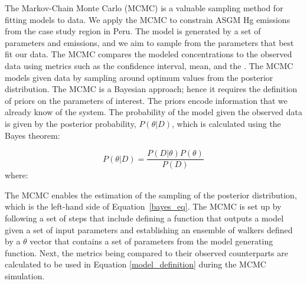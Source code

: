 \begin{flushleft}
The Markov-Chain Monte Carlo (MCMC) is a valuable sampling method for fitting models to data\cite{hogg_data_2018}. We apply the MCMC to constrain ASGM Hg emissions from the case study region in Peru.  The model is generated by a set of parameters and emissions, and we aim to sample from the parameters that best fit our data. The MCMC compares the modeled concentrations to the observed data using metrics such as the \nft confidence interval, mean, and the \iq. The MCMC models given data by sampling around optimum values from the posterior distribution. The MCMC is a Bayesian approach; hence it requires the definition of priors on the parameters of interest. The priors encode information that we already know of the system. The probability of the model given the observed data is given by the posterior probability, $P(\theta|D)$, which is calculated using the Bayes theorem:

\begin{equation}
\label{bayes_eq}
P(\theta|D)=\frac{P(D|\theta)P(\theta)}{P(D)}
\end{equation}
where:
\end{flushleft}


\begin{flushleft}
The MCMC enables the estimation of the sampling of the posterior distribution, which is the left-hand side of Equation~\ref{bayes_eq}. The MCMC is set up by following a set of steps that include defining a function that outputs a model given a set of input parameters and establishing an ensemble of walkers defined by a $\theta$ vector that contains a set of parameters from the model generating function.
Next, the metrics being compared to their observed counterparts are calculated to be used in Equation \ref{model_definition} during the MCMC simulation. 
\end{flushleft}



